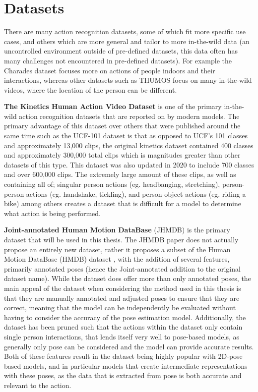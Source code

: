 \section{Datasets}
\label{sec:datasets}

There are many action recognition datasets, some of which fit more specific use cases, and others which are more general and tailor to more in-the-wild data (an uncontrolled environment outside of pre-defined datasets, this data often has many challenges not encountered in pre-defined datasets). For example the Charades dataset \cite{charades} focuses more on actions of people indoors and their interactions, whereas other datasets such as THUMOS \cite{THUMOS15} focus on many in-the-wild videos, where the location of the person can be different.

\textbf{The Kinetics Human Action Video Dataset} \cite{kinetics} is one of the primary in-the-wild action recognition datasets that are reported on by modern models. The primary advantage of this dataset over others that were published around the same time such as the UCF-101 dataset \cite{ucf101} is that as opposed to UCF's 101 classes and approximately 13,000 clips, the original kinetics dataset contained 400 classes and approximately 300,000 total clips which is magnitudes greater than other datasets of this type. This dataset was also updated in 2020 to include 700 classes and over 600,000 clips. The extremely large amount of these clips, as well as containing all of; singular person actions (eg. headbanging, stretching), person-person actions (eg. handshake, tickling), and person-object actions (eg. riding a bike) among others creates a dataset that is difficult for a model to determine what action is being performed.

\textbf{Joint-annotated Human Motion DataBase} (JHMDB) \cite{JHMDB} is the primary dataset that will be used in this thesis. The JHMDB paper does not actually propose an entirely new dataset, rather it proposes a subset of the Human Motion DataBase (HMDB) dataset \cite{hmdb}, with the addition of several features, primarily annotated poses (hence the Joint-annotated addition to the original dataset name). While the dataset does offer more than only annotated poses, the main appeal of the dataset when considering the method used in this thesis is that they are manually  annotated and adjusted poses to ensure that they are correct, meaning that the model can be independently be evaluated without having to consider the accuracy of the pose estimation model. Additionally, the dataset has been pruned such that the actions within the dataset only contain single person interactions, that lends itself very well to pose-based models, as generally only pose can be considered and the model can provide accurate results. Both of these features result in the dataset being highly popular with 2D-pose based models, and in particular models that create intermediate representations with these poses, as the data that is extracted from pose is both accurate and relevant to the action.

